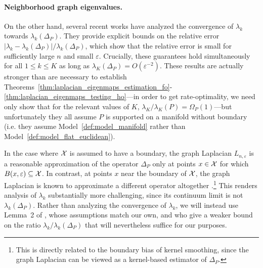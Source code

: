 \paragraph{Neighborhood graph eigenvalues.}
On the other hand, several recent works \citep{burago2014,garciatrillos18,calder2019} have analyzed the convergence of $\lambda_{k}$ towards $\lambda_{k}(\Delta_P)$. They provide explicit bounds on the relative error $|\lambda_{k} - \lambda_{k}(\Delta_P)|/\lambda_{k}(\Delta_P)$, which show that the relative error is small for sufficiently large $n$ and small $\varepsilon$. Crucially, these guarantees hold simultaneously for all $1 \leq k \leq K$ as long as $\lambda_{K}(\Delta_P) = O(\varepsilon^{-2})$. These results are actually stronger than are necessary to establish Theorems~\ref{thm:laplacian_eigenmaps_estimation_fo}-\ref{thm:laplacian_eigenmaps_testing_ho}---in order to get rate-optimality, we need only show that for the relevant values of $K$, $\lambda_{K}/\lambda_K(P) = \Omega_P(1)$---but unfortunately they all assume $P$ is supported on a manifold without boundary (i.e. they assume Model~\ref{def:model_manifold} rather than Model~\ref{def:model_flat_euclidean}). 

In the case where $\mathcal{X}$ is assumed to have a boundary, the graph Laplacian $L_{n,\varepsilon}$ is a reasonable approximation of the operator $\Delta_P$ only at points $x \in \mathcal{X}$ for which $B(x,\varepsilon) \subseteq \mathcal{X}$. In contrast, at points $x$ near the boundary of $\mathcal{X}$, the graph Laplacian is known to approximate a different operator altogether \citep{belkin2012}.\footnote{This is directly related to the boundary bias of kernel smoothing, since the graph Laplacian can be viewed as a kernel-based estimator of $\Delta_P$.} This renders analysis of $\lambda_k$ substantially more challenging, since its continuum limit is not $\lambda_k(\Delta_P)$.  Rather than analyzing the convergence of $\lambda_k$, we will instead use Lemma~2 of \cite{green2021}, whose assumptions match our own, and who give a weaker bound on the ratio $\lambda_k/\lambda_k(\Delta_P)$ that will nevertheless suffice for our purposes. 

